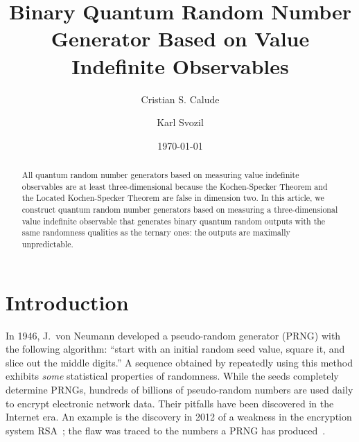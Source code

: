 \documentclass[%
 reprint,
 superscriptaddress,
 showpacs,
 showkeys,
 nofootinbib,
  amsmath,amssymb,
 pra,
  longbibliography,
  floatfix,
 ]{revtex4-2}
\theoremstyle{definition}
\begin{document}
\title{Binary Quantum Random Number Generator Based on Value Indefinite
Observables}

\author{Cristian S. Calude}




\author{Karl Svozil}



\date{\today}

\begin{abstract}
All quantum random number generators based on measuring value indefinite observables are at least three-dimensional because the Kochen-Specker Theorem and the Located Kochen-Specker Theorem are false in dimension two. In this article, we construct quantum random number generators based on measuring a three-dimensional value indefinite observable that generates binary quantum random outputs with the same randomness qualities as the ternary ones: the outputs are maximally unpredictable.
\end{abstract}


\maketitle

\newpage



\section{Introduction}

In 1946, J.~von Neumann developed a pseudo-random generator (PRNG) with the following algorithm:
``start with an initial random seed value, square it, and slice out the middle digits.''
A sequence obtained by repeatedly using this method exhibits {\it some} statistical properties of randomness.
While the seeds completely determine PRNGs, hundreds of billions of pseudo-random numbers are used daily to encrypt electronic network data.
Their pitfalls have been discovered in the Internet era.
An example is the discovery in 2012 of a weakness in the encryption system RSA~\cite{prng_flow};
the flaw was traced to the numbers a PRNG has produced~\cite{factor_wrong2012}.
\end{document}
